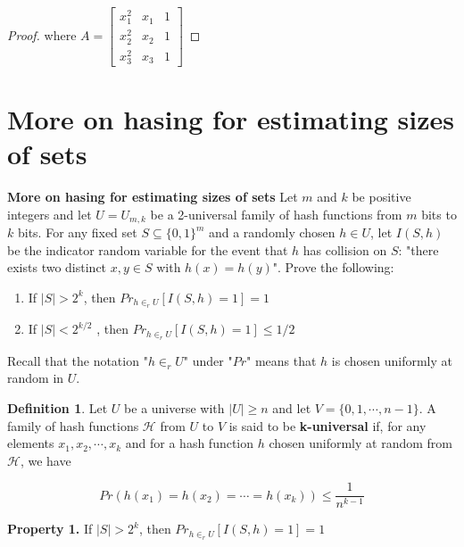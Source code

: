 \documentclass[12pt, a4paper]{article} %
\theoremstyle{definition}
\newtheorem{definition}{Definition}[section]
\begin{document}
\begin{proof}
where $A = \begin{bmatrix} x_1^2 & x_1 & 1\\ x_2^2 & x_2 & 1\\ x_3^2 & x_3 & 1 \end{bmatrix}$

\end{proof}


\newpage

\section{More on hasing for estimating sizes of sets}

\textbf{More on hasing for estimating sizes of sets} \quad Let $m$ and $k$ be positive integers and let $U = U_{m,k}$ be a 2-universal family of hash functions from $m$ bits to $k$ bits. For any fixed set $S \subseteq \{0,1\}^m$ and a randomly chosen $h \in U$, let $I(S,h)$ be the indicator random variable for the event that $h$ has collision on $S$: "there exists two distinct $x,y \in S$ with $h(x) = h(y)$". Prove the following:

\begin{enumerate}
  \item If $|S| > 2^{k}$, then $Pr_{h \in_r U} [I(S,h) = 1] = 1$
  \item If $|S| < 2^{k/2}$ , then $Pr_{h \in_r U} [I(S,h) = 1] \leq 1/2$
\end{enumerate}

Recall that the notation "$h \in_r U$" under "$Pr$" means that $h$ is chosen uniformly at random in $U$.

\begin{definition}
  Let $U$ be a universe with $|U| \geq n$ and let $V = \{0,1,\cdots, n- 1\}$. A family of hash functions $\mathcal{H}$ from $U$ to $V$ is said to be \textbf{k-universal} if, for any elements $x_1, x_2, \cdots, x_k$ and for a hash function $h$ chosen uniformly at random from $\mathcal{H}$, we have

  \[
    Pr(h(x_1) = h(x_2) = \cdots = h(x_k)) \leq \frac{1}{n^{k-1}}

  \]
\end{definition}

\textbf{Property 1.} \quad If $|S| > 2^{k}$, then $Pr_{h \in_r U} [I(S,h) = 1] = 1$
\end{document}

